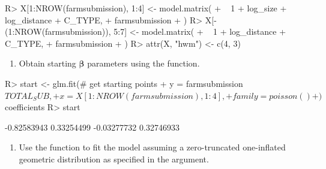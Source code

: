 \documentclass[nojss]{jss}
\providecommand{\tightlist}{%
  \setlength{\itemsep}{0pt}\setlength{\parskip}{0pt}}
\newcommand{\1}{\mathcal{I}} \newcommand{\bZero}{\boldsymbol{0}}
\begin{document}
\begin{CodeChunk}
\begin{CodeInput}
R> X[1:NROW(farmsubmission), 1:4] <- model.matrix(
+   ~ 1 + log_size + log_distance + C_TYPE,
+   farmsubmission
+ )
R> X[-(1:NROW(farmsubmission)), 5:7] <- model.matrix(
+   ~ 1 + log_distance + C_TYPE,
+   farmsubmission
+ )
R> attr(X, "hwm") <- c(4, 3)
\end{CodeInput}
\end{CodeChunk}

\begin{enumerate}
\def\labelenumi{\arabic{enumi}.}
\setcounter{enumi}{2}
\tightlist
\item
  Obtain starting \(\boldsymbol{\beta}\) parameters using the
   function.
\end{enumerate}

\begin{CodeChunk}
\begin{CodeInput}
R> start <- glm.fit(# get starting points
+   y = farmsubmission$TOTAL_SUB,
+   x = X[1:NROW(farmsubmission), 1:4],
+   family = poisson()
+ )$coefficients
R> start
\end{CodeInput}
\begin{CodeOutput}
[1] -0.82583943  0.33254499 -0.03277732  0.32746933
\end{CodeOutput}
\end{CodeChunk}

\begin{enumerate}
\def\labelenumi{\arabic{enumi}.}
\setcounter{enumi}{3}
\tightlist
\item
  Use the  function to fit the model assuming a
  zero-truncated one-inflated geometric distribution as specified in the
   argument.
\end{enumerate}

\begin{CodeChunk}
\end{CodeChunk}
\end{document}
